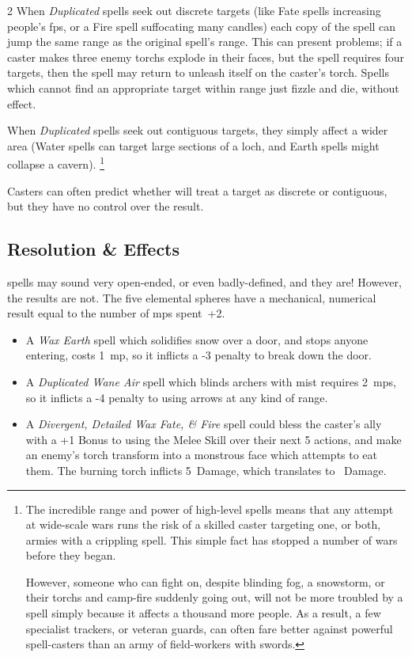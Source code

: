 \begin{multicols}{2}
When \textit{Duplicated} spells seek out discrete targets (like Fate spells increasing people's \glspl{fp}, or a Fire spell suffocating many candles) each copy of the spell can jump the same range as the original spell's range.
This can present problems; if a caster makes three enemy \glspl{torch} explode in their faces, but the spell requires four targets, then the spell may return to unleash itself on the caster's \gls{torch}.
Spells which cannot find an appropriate target within range just fizzle and die, without effect.

When \textit{Duplicated} spells seek out contiguous targets, they simply affect a wider area
(Water spells can target large sections of a loch, and Earth spells might collapse a cavern).%
\footnote{The incredible range and power of high-level spells means that any attempt at wide-scale wars runs the risk of a skilled caster targeting one, or both, armies with a crippling spell.
  This simple fact has stopped a number of wars before they began.

  However, someone who can fight on, despite blinding fog, a snowstorm, or their \glspl{torch} and camp-fire suddenly going out, will not be more troubled by a spell simply because it affects a thousand more people.
  As a result, a few specialist trackers, or veteran \glspl{guard}, can often fare better against powerful spell-casters than an army of field-workers with swords.}

Casters can often predict whether  will treat a target as discrete or contiguous, but they have no control over the result.

\subsection{Resolution \& Effects}

\Glspl{spell} may sound very open-ended, or even badly-defined, and they are!
However, the results are not.
The five elemental \glspl{sphere} have a mechanical, numerical result equal to the number of \glspl{mp} spent~+2.

\begin{itemize}
  \item
  A \textit{Wax Earth} spell which solidifies snow over a door, and stops anyone entering, costs 1~\gls{mp}, so it inflicts a -3 penalty to break down the door.
  \item
  A \textit{Duplicated Wane Air} spell which blinds archers with mist requires 2~\glspl{mp}, so it inflicts a -4 penalty to using arrows at any kind of range.
  \item
  A \textit{Divergent, Detailed Wax Fate, \& Fire} spell could bless the caster's ally with a +1 Bonus to using the Melee Skill over their next 5 actions, and make an enemy's \gls{torch} transform into a monstrous face which attempts to eat them.
  The burning \gls{torch} inflicts 5~Damage, which translates to ~Damage.%
\end{itemize}


\end{multicols}

